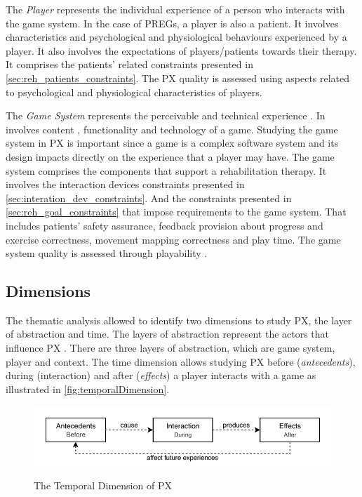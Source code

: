 The \textit{Player} represents the individual experience of a person who interacts with the game system. In the case of \acp{PREG}, a player is also a patient. It involves characteristics \autocite{Elson2014,Fernandez2008,Mayra} and psychological \autocite{Elson2014} and physiological behaviours experienced by a player. It also involves the expectations of players/patients towards their therapy. It comprises the patients' related constraints presented in \autoref{sec:reh_patients_constraints}. The \ac{PX} quality is assessed using aspects related to psychological and physiological characteristics of players.

The \textit{Game System} represents the perceivable and technical experience \autocite{Nackea2,Elson2014}. In involves content \autocite{Elson2014,Nackea2,Fernandez2008}, functionality \autocite{Engl2013,Nacked} and technology \autocite{Engl2013,Fernandez2008} of a game. Studying the game system in \ac{PX} is important since a game is a complex software system \autocite{Mayra,Nackea} and its design impacts directly on the experience that a player may have. The game system comprises the components that support a rehabilitation therapy. It involves the interaction devices constraints presented in \autoref{sec:interation_dev_constraints}. And the constraints presented in \autoref{sec:reh_goal_constraints} that impose requirements to the game system. That includes patients' safety assurance, feedback provision about progress and exercise correctness, movement mapping correctness and play time. The game system quality is assessed through playability \autocite{Engl2013,Nackea2}.

\subsection{Dimensions}
The thematic analysis allowed to identify two dimensions to study \ac{PX}, the layer of abstraction and time. The layers of abstraction represent the actors that influence \ac{PX} \autocite{Nacked,Nackea2,Engl2013,Elson2014}. There are three layers of abstraction, which are game system, player and context. The time dimension allows studying \ac{PX} before (\textit{antecedents}), during (interaction) and after (\textit{\textit{effects}}) a player interacts with a game \autocite{Elson2014,Fernandez2008,Nackea2,Nackea,Nacked} as illustrated in \autoref{fig:temporalDimension}.

\begin{figure}[bth]
\myfloatalign
{\includegraphics[width=.9\linewidth]{gfx/model/temporalDimension}} \quad
\caption{The Temporal Dimension of \ac{PX}}\label{fig:temporalDimension}
\end{figure}

